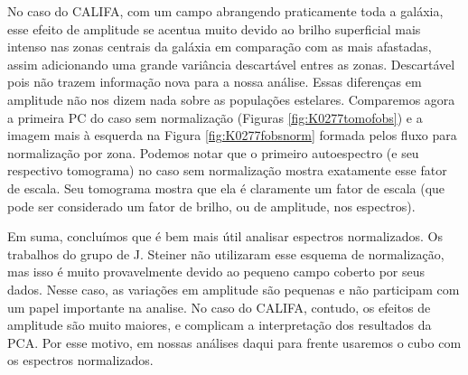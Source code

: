 No caso do CALIFA, com um campo abrangendo praticamente toda a galáxia, esse efeito de amplitude se acentua muito devido
ao brilho superficial mais intenso nas zonas centrais da galáxia em comparação com as mais afastadas, assim adicionando
uma grande variância descartável entres as zonas. Descartável pois não trazem informação nova para a nossa análise.
Essas diferenças em amplitude não nos dizem nada sobre as populações estelares. Comparemos agora a primeira PC do caso
sem normalização (Figuras \ref{fig:K0277tomofobs}) e a imagem mais à esquerda na Figura \ref{fig:K0277fobsnorm} formada
pelos fluxo para normalização por zona. Podemos notar que o primeiro autoespectro (e seu respectivo tomograma) no caso
sem normalização mostra exatamente esse fator de escala. Seu tomograma mostra que ela é claramente um fator de escala
(que pode ser considerado um fator de brilho, ou de amplitude, nos espectros).

Em suma, concluímos que é bem mais útil analisar espectros normalizados. Os trabalhos do grupo de J. Steiner não
utilizaram esse esquema de normalização, mas isso é muito provavelmente devido ao pequeno campo coberto por seus dados.
Nesse caso, as variações em amplitude são pequenas e não participam com um papel importante na analise. No caso do
CALIFA, contudo, os efeitos de amplitude são muito maiores, e complicam a interpretação dos resultados da PCA. Por esse
motivo, em nossas análises daqui para frente usaremos o cubo com os espectros normalizados.

